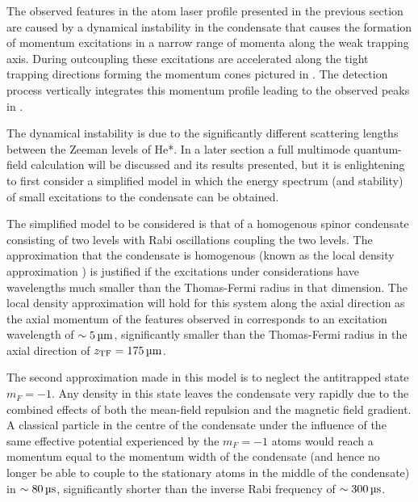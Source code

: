 The observed features in the atom laser profile presented in the previous section are caused by a dynamical instability in the condensate that causes the formation of momentum excitations in a narrow range of momenta along the weak trapping axis. During outcoupling these excitations are accelerated along the tight trapping directions forming the momentum cones pictured in . The detection process vertically integrates this momentum profile leading to the observed peaks in .

The dynamical instability is due to the significantly different scattering lengths between the Zeeman levels of He*. In a later section a full multimode quantum-field calculation will be discussed and its results presented, but it is enlightening to first consider a simplified model in which the energy spectrum (and stability) of small excitations to the condensate can be obtained.

The simplified model to be considered is that of a homogenous spinor condensate consisting of two levels with Rabi oscillations coupling the two levels. The approximation that the condensate is homogenous (known as the local density approximation \cite{Stamper-Kurn:1999,Zambelli:2000}) is justified if the excitations under considerations have wavelengths much smaller than the Thomas-Fermi radius in that dimension. The local density approximation will hold for this system along the axial direction as the axial momentum of the features observed in  corresponds to an excitation wavelength of $\sim \unit[5]{\micro m}$, significantly smaller than the Thomas-Fermi radius in the axial direction of $z_\text{TF} = \unit[175]{\micro m}$. 

The second approximation made in this model is to neglect the antitrapped state $m_F=-1$. Any density in this state leaves the condensate very rapidly due to the combined effects of both the mean-field repulsion and the magnetic field gradient. A classical particle in the centre of the condensate under the influence of the same effective potential experienced by the $m_F=-1$ atoms would reach a momentum equal to the momentum width of the condensate (and hence no longer be able to couple to the stationary atoms in the middle of the condensate) in $\sim\unit[80]{\micro s}$, significantly shorter than the inverse Rabi frequency of $\sim \unit[300]{\micro s}$.

